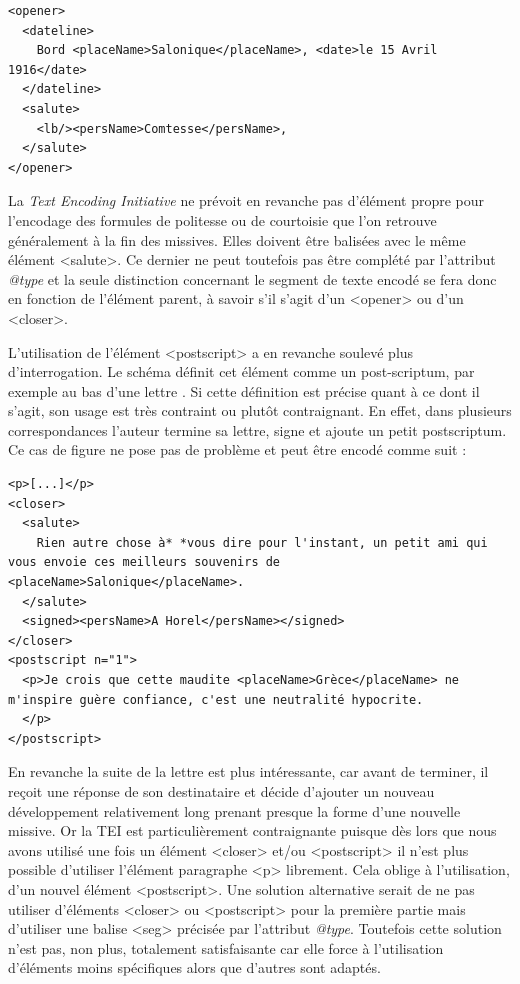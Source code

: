 \documentclass[12pt,a4paper]{book} %
\begin{document}
\begin{lstlisting}
<opener>
  <dateline>
    Bord <placeName>Salonique</placeName>, <date>le 15 Avril 1916</date>
  </dateline>
  <salute>
    <lb/><persName>Comtesse</persName>,
  </salute>
</opener>
\end{lstlisting}
\bigskip

La \textit{Text Encoding Initiative} ne prévoit en revanche pas d'élément propre pour l'encodage des formules de politesse ou de courtoisie que l'on retrouve généralement à la fin des missives. Elles doivent être balisées avec le même élément <salute>. Ce dernier ne peut toutefois pas être complété par l'attribut \textit{@type} et la seule distinction concernant le segment de texte encodé se fera donc en fonction de l'élément parent, à savoir s'il s'agit d'un <opener> ou d'un <closer>.

L'utilisation de l'élément <postscript> a en revanche soulevé plus d'interrogation. Le schéma définit cet élément comme \og [contenant] un post-scriptum, par exemple au bas d'une lettre \fg{}. Si cette définition est précise quant à ce dont il s'agit, son usage est très contraint ou plutôt contraignant. En effet, dans plusieurs correspondances l'auteur termine sa lettre, signe et ajoute un petit postscriptum. Ce cas de figure ne pose pas de problème et peut être encodé comme suit : 
\bigskip

\begin{lstlisting}
<p>[...]</p>               
<closer>
  <salute>
    Rien autre chose à* *vous dire pour l'instant, un petit ami qui vous envoie ces meilleurs souvenirs de <placeName>Salonique</placeName>.
  </salute>
  <signed><persName>A Horel</persName></signed>
</closer>
<postscript n="1">
  <p>Je crois que cette maudite <placeName>Grèce</placeName> ne m'inspire guère confiance, c'est une neutralité hypocrite.
  </p>
</postscript>
\end{lstlisting}
\bigskip

En revanche la suite de la lettre est plus intéressante, car avant de terminer, il reçoit une réponse de son destinataire et décide d'ajouter un nouveau développement relativement long prenant presque la forme d'une nouvelle missive. Or la TEI est particulièrement contraignante puisque dès lors que nous avons utilisé une fois un élément <closer> et/ou <postscript> il n'est plus possible d'utiliser l'élément paragraphe <p> librement. Cela oblige à l'utilisation, d'un nouvel élément <postscript>. Une solution alternative serait de ne pas utiliser d'éléments <closer> ou <postscript> pour la première partie mais d'utiliser une balise <seg> précisée par l'attribut \textit{@type}. Toutefois cette solution n'est pas, non plus, totalement satisfaisante  car elle force à l'utilisation d'éléments moins spécifiques alors que d'autres sont adaptés.
\end{document}
